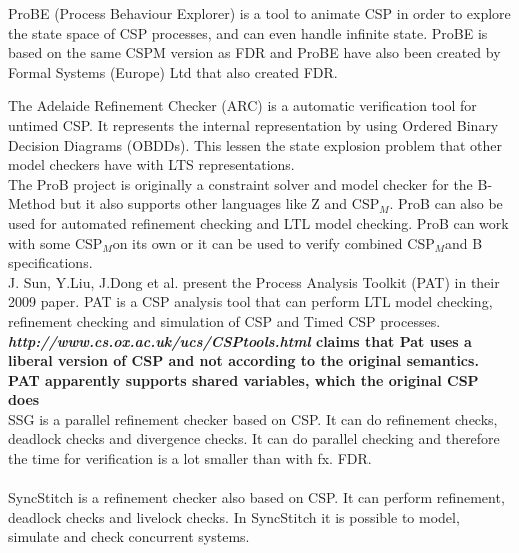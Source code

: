 \documentclass[a4paper]{report}
\newcommand{\cspm}{CSP$_M$}
\begin{document}
ProBE (Process Behaviour Explorer)\cite{probe}  is a tool to animate CSP in order to explore the state space of CSP processes, and can even handle infinite state. ProBE is based on the same CSPM version as FDR and ProBE have also been created by Formal Systems (Europe) Ltd that also created FDR. 

The Adelaide Refinement Checker (ARC)\cite{Parashkevov1996} is a automatic verification tool for untimed CSP. It represents the internal representation by using Ordered Binary Decision Diagrams (OBDDs). This lessen the state explosion problem that other model checkers have with LTS representations.   \\ 

The ProB project\cite{ProB} is originally a constraint solver and model checker for the B-Method but it also supports other languages like Z and \cspm. ProB can also be used for automated refinement checking and LTL model checking. ProB can work with some \cspm on its own or it can be used to verify combined \cspm and B specifications. \\

J. Sun, Y.Liu, J.Dong et al. present the Process Analysis Toolkit (PAT) in their 2009 paper\cite{Sun2009}. PAT is a CSP analysis tool that can perform LTL model checking, refinement checking and simulation of CSP and Timed CSP processes. \textbf{\textit{http://www.cs.ox.ac.uk/ucs/CSPtools.html} claims that Pat uses a liberal version of CSP and not according to the original semantics. PAT apparently supports shared variables, which the original CSP does }\\

SSG is a parallel refinement checker based on CSP. It can do refinement checks, deadlock checks and divergence checks. It can do parallel checking and therefore the time for verification is a lot smaller than with fx. FDR. \\\\

SyncStitch is a refinement checker also based on CSP. It can perform refinement, deadlock checks and livelock checks. In SyncStitch it is possible to model, simulate and check concurrent systems.  \\\\
\end{document}
